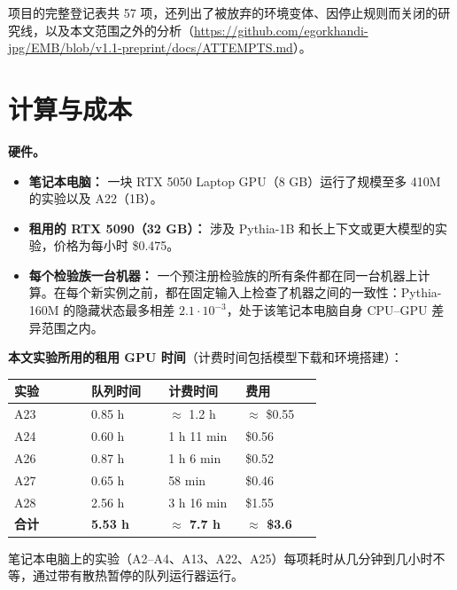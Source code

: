 \documentclass[UTF8,fontset=none,a4paper]{ctexart}
\begin{document}
项目的完整登记表共 57 项，还列出了被放弃的环境变体、因停止规则而关闭的研究线，以及本文范围之外的分析（\url{https://github.com/egorkhandi-jpg/EMB/blob/v1.1-preprint/docs/ATTEMPTS.md}）。

\section{计算与成本}

\textbf{硬件。}
\begin{itemize}
\item \textbf{笔记本电脑：} 一块 RTX 5050 Laptop GPU（8 GB）运行了规模至多 410M 的实验以及 A22（1B）。
\item \textbf{租用的 RTX 5090（32 GB）：} 涉及 \mbox{Pythia-1B} 和长上下文或更大模型的实验，价格为每小时 \$0.475。
\item \textbf{每个检验族一台机器：} 一个预注册检验族的所有条件都在同一台机器上计算。在每个新实例之前，都在固定输入上检查了机器之间的一致性：\mbox{Pythia-160M} 的隐藏状态最多相差 $2.1\cdot 10^{-3}$，处于该笔记本电脑自身 \mbox{CPU--GPU} 差异范围之内。
\end{itemize}

\textbf{本文实验所用的租用 GPU 时间}（计费时间包括模型下载和环境搭建）：

\begin{center}\small\begin{tabular}{p{0.23\linewidth} p{0.23\linewidth} p{0.23\linewidth} p{0.23\linewidth}}\hline
\textbf{实验} & \textbf{队列时间} & \textbf{计费时间} & \textbf{费用} \\ \hline
A23 & 0.85 h & $\approx$ 1.2 h & $\approx$ \$0.55 \\
A24 & 0.60 h & 1 h 11 min & \$0.56 \\
A26 & 0.87 h & 1 h 6 min & \$0.52 \\
A27 & 0.65 h & 58 min & \$0.46 \\
A28 & 2.56 h & 3 h 16 min & \$1.55 \\
\textbf{合计} & \textbf{5.53 h} & \textbf{$\approx$ 7.7 h} & \textbf{$\approx$ \$3.6} \\
\hline\end{tabular}\end{center}

笔记本电脑上的实验（\mbox{A2--A4}、A13、A22、A25）每项耗时从几分钟到几小时不等，通过带有散热暂停的队列运行器运行。
\end{document}
